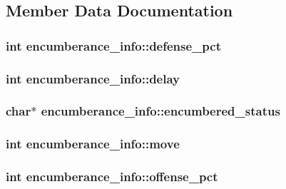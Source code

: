\subsection{Member Data Documentation}
\hypertarget{structencumberance__info_af06509d4e25c3b78fc3e33f8b707d499}{
\subsubsection[{defense\-\_\-pct}]{\setlength{\rightskip}{0pt plus 5cm}int encumberance\-\_\-info\-::defense\-\_\-pct}}\label{structencumberance__info_af06509d4e25c3b78fc3e33f8b707d499}
\hypertarget{structencumberance__info_aab6d07743a554bf638808d3b03f32b85}{
\subsubsection[{delay}]{\setlength{\rightskip}{0pt plus 5cm}int encumberance\-\_\-info\-::delay}}\label{structencumberance__info_aab6d07743a554bf638808d3b03f32b85}
\hypertarget{structencumberance__info_afaf76f823787c7af302e587b657c096a}{
\subsubsection[{encumbered\-\_\-status}]{\setlength{\rightskip}{0pt plus 5cm}char$\ast$ encumberance\-\_\-info\-::encumbered\-\_\-status}}\label{structencumberance__info_afaf76f823787c7af302e587b657c096a}
\hypertarget{structencumberance__info_a88e17151ed64a63d9d0333949f0dc988}{
\subsubsection[{move}]{\setlength{\rightskip}{0pt plus 5cm}int encumberance\-\_\-info\-::move}}\label{structencumberance__info_a88e17151ed64a63d9d0333949f0dc988}
\hypertarget{structencumberance__info_add8426edbd9a6eecfb81c2fa07a7ad75}{
\subsubsection[{offense\-\_\-pct}]{\setlength{\rightskip}{0pt plus 5cm}int encumberance\-\_\-info\-::offense\-\_\-pct}}\label{structencumberance__info_add8426edbd9a6eecfb81c2fa07a7ad75}
